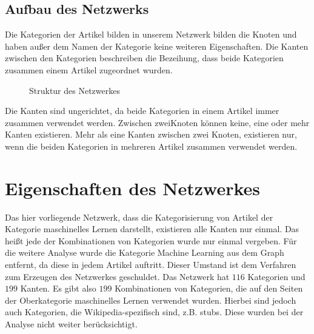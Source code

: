 \documentclass{acm_proc_article-sp}
\begin{document}
\subsection{Aufbau des Netzwerks}
Die Kategorien der Artikel bilden in unserem Netzwerk bilden die Knoten und haben außer dem Namen der Kategorie keine weiteren Eigenschaften. Die Kanten zwischen den Kategorien beschreiben die Bezeihung, dass beide Kategorien zusammen einem Artikel zugeordnet wurden. 
\begin{figure}[H]
\centering
{}
\caption{Struktur des Netzwerkes}
\end{figure}
Die Kanten sind ungerichtet, da beide Kategorien in einem Artikel immer zusammen verwendet werden. Zwischen zweiKnoten können keine, eine oder mehr Kanten existieren. Mehr als eine Kanten zwischen zwei Knoten, existieren nur, wenn die beiden Kategorien in mehreren Artikel zusammen verwendet werden.

\section{Eigenschaften des Netzwerkes}
Das hier vorliegende Netzwerk, dass die Kategorisierung von Artikel der Kategorie maschinelles Lernen darstellt, existieren alle Kanten nur einmal. Das heißt jede der Kombinationen von Kategorien wurde nur einmal vergeben.
Für die weitere Analyse wurde die Kategorie Machine Learning aus dem Graph entfernt, da diese in jedem Artikel auftritt. Dieser Umstand ist dem Verfahren zum Erzeugen des Netzwerkes geschuldet. Das Netzwerk hat $116$ Kategorien und $199$ Kanten. Es gibt also $199$ Kombinationen von Kategorien, die auf den Seiten der Oberkategorie maschinelles Lernen verwendet wurden. Hierbei sind jedoch auch Kategorien, die Wikipedia-spezifisch sind, z.B. stubs. Diese wurden bei der Analyse nicht weiter berücksichtigt.
\newpage
\end{document}
